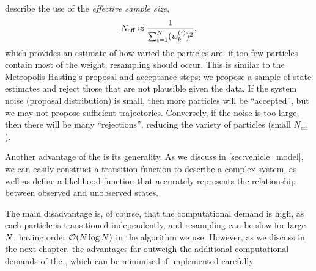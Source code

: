 \citet{Doucet_2000} describe the use of the \emph{effective sample size},
\begin{equation}
    \label{eq:Neff}
    N_{\text{eff}} \approx \frac{1}{\sum_{i=1}^N (w_k^{(i)})^2},
\end{equation}
which provides an estimate of how varied the particles are: if too few particles contain most of the weight, resampling should occur. This is similar to the Metropolis-Hasting's proposal and acceptance steps: we propose a sample of state estimates and reject those that are not plausible given the data. If the system noise (proposal distribution) is small, then more particles will be ``accepted'', but we may not propose sufficient trajectories. Conversely, if the noise is too large, then there will be many ``rejections'', reducing the variety of particles (small $N_\text{eff}$).

Another advantage of the \pf{} is its generality. As we discuss in \cref{sec:vehicle_model}, we can easily construct a transition function to describe a complex system, as well as define a likelihood function that accurately represents the relationship between observed and unobserved states.

The main disadvantage is, of course, that the computational demand is high, as each particle is transitioned independently, and resampling can be slow for large $N$, having order $\mathcal{O}(N\log N)$ in the  algorithm we use. However, as we discuss in the next chapter, the advantages far outweigh the additional computational demands of the \pf{}, which can be minimised if implemented carefully.
